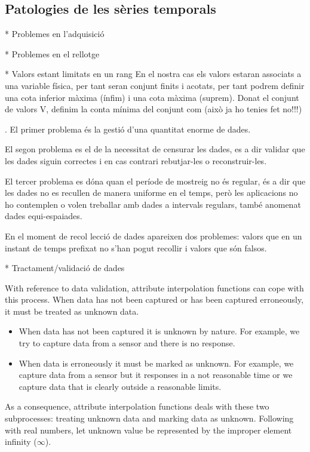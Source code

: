 \subsection{Patologies de les sèries temporals}

* Problemes en l'adquisició

* Problemes en el rellotge

* Valors estant limitats en un rang
En el nostra cas els valors estaran associats a una variable física, per tant seran conjunt finits i acotats, per tant podrem definir una cota inferior màxima (ínfim) i una cota màxima (suprem). Donat el conjunt de valors V, definim la conta mínima del conjunt com     (això ja ho tenies fet no!!!)

. El primer problema  és la gestió d’una quantitat enorme de dades.

El segon problema  es el de la necessitat de censurar les dades,  es a dir validar que les dades
siguin correctes i en cas contrari rebutjar-les o reconstruir-les.

El tercer problema es dóna quan el període de mostreig no  és regular,  és a dir que les dades no es recullen de manera uniforme en el temps, però les aplicacions no ho contemplen o volen treballar amb dades a intervals regulars, també anomenat dades equi-espaiades.

En el moment  de recol lecció de dades apareixen dos problemes: valors que en un instant de temps prefixat no s'han pogut recollir i valors que són falsos.



* Tractament/validació de dades

With reference to data validation, attribute interpolation functions
can cope with this process. When data has not been captured or has
been captured erroneously, it must be treated as unknown data.
\begin{itemize}
\item When data has not been captured it is unknown by nature. For
  example, we try to capture data from a sensor and there is no
  response.
\item When data is erroneously it must be marked as unknown. For
  example, we capture data from a sensor but it responses in a not
  reasonable time or we capture data that is clearly outside a
  reasonable limits.
\end{itemize}
As a consequence, attribute interpolation functions deals with these
two subprocesses: treating unknown data and marking data as
unknown. Following with real numbers, let unknown value be represented
by the improper element infinity ($\infty$).  



